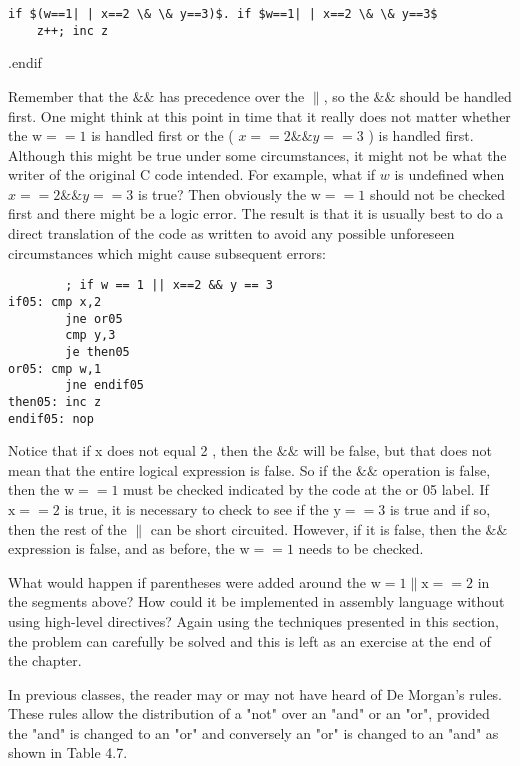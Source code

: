 \documentclass[10pt]{article}
\begin{document}
\begin{verbatim}
if $(w==1| | x==2 \& \& y==3)$. if $w==1| | x==2 \& \& y==3$
    z++; inc z
\end{verbatim}

.endif

Remember that the $\& \&$ has precedence over the $\|$, so the $\& \&$ should be handled first. One might think at this point in time that it really does not matter whether the $\mathrm{w}==1$ is handled first or the ( $x==2 \& \& y==3$ ) is handled first. Although this might be true under some circumstances, it might not be what the writer of the original C code intended. For example, what if $w$ is undefined when $x==2 \& \& y==3$ is true? Then obviously the $\mathrm{w}==1$ should not be checked first and there might be a logic error. The result is that it is usually best to do a direct translation of the code as written to avoid any possible unforeseen circumstances which might cause subsequent errors:

\begin{verbatim}
        ; if w == 1 || x==2 && y == 3
if05: cmp x,2
        jne or05
        cmp y,3
        je then05
or05: cmp w,1
        jne endif05
then05: inc z
endif05: nop
\end{verbatim}

Notice that if x does not equal 2 , then the $\& \&$ will be false, but that does not mean that the entire logical expression is false. So if the $\& \&$ operation is false, then the $\mathrm{w}==1$ must be checked indicated by the code at the or 05 label. If $\mathrm{x}==2$ is true, it is necessary to check to see if the $\mathrm{y}==3$ is true and if so, then the rest of the $\|$ can be short circuited. However, if it is false, then the $\& \&$ expression is false, and as before, the $\mathrm{w}==1$ needs to be checked.

What would happen if parentheses were added around the $\mathrm{w}=1 \| \mathrm{x}==2$ in the segments above? How could it be implemented in assembly language without using high-level directives? Again using the techniques presented in this section, the problem can carefully be solved and this is left as an exercise at the end of the chapter.

In previous classes, the reader may or may not have heard of De Morgan's rules. These rules allow the distribution of a "not" over an "and" or an "or", provided the "and" is changed to an "or" and conversely an "or" is changed to an "and" as shown in Table 4.7.
\end{document}
